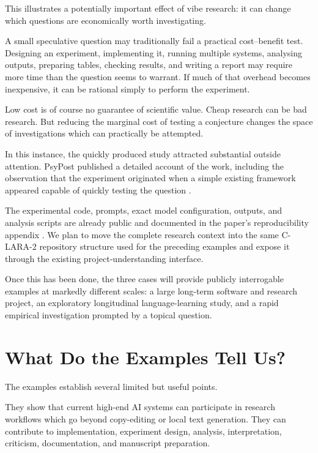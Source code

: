 This illustrates a potentially important effect of vibe research: it can change which questions are economically worth investigating.

A small speculative question may traditionally fail a practical cost--benefit test. Designing an experiment, implementing it, running multiple systems, analysing outputs, preparing tables, checking results, and writing a report may require more time than the question seems to warrant. If much of that overhead becomes inexpensive, it can be rational simply to perform the experiment.

Low cost is of course no guarantee of scientific value. Cheap research can be bad research. But reducing the marginal cost of testing a conjecture changes the space of investigations which can practically be attempted.

In this instance, the quickly produced study attracted substantial outside attention. PsyPost published a detailed account of the work, including the observation that the experiment originated when a simple existing framework appeared capable of quickly testing the question \citep{dolan2025grok}.

The experimental code, prompts, exact model configuration, outputs, and analysis scripts are already public and documented in the paper's reproducibility appendix \citep[Appendix~A]{raynerChatGPT2025grok}. We plan to move the complete research context into the same C-LARA-2 repository structure used for the preceding examples and expose it through the existing project-understanding interface.

Once this has been done, the three cases will provide publicly interrogable examples at markedly different scales: a large long-term software and research project, an exploratory longitudinal language-learning study, and a rapid empirical investigation prompted by a topical question.


\section{What Do the Examples Tell Us?}

The examples establish several limited but useful points.

They show that current high-end AI systems can participate in research workflows which go beyond copy-editing or local text generation. They can contribute to implementation, experiment design, analysis, interpretation, criticism, documentation, and manuscript preparation.

